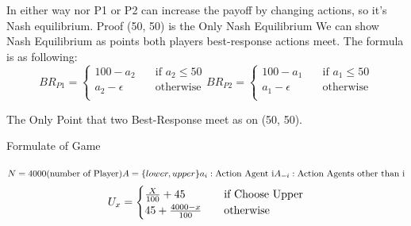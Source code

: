 \documentclass[
  course = {{IE579 Game Theory and Multi-Agent Reinforcement Learning}},
  assignment = 1,
  name = {{Mohammad Mahdi Rahimi}},
  studentnumber = {{20208244}},
  email = {{mahi@kaist.ac.kr}},
  firstexercise = 1
]{aga-homework}
\begin{document}
In either way nor P1 or P2 can increase the payoff by changing actions, so it's Nash equilibrium.
\newpage
\subexercise Proof (50, 50) is the Only Nash Equilibrium
We can show Nash Equilibrium as points both players best-response actions meet.
The formula is as following:
\[ BR_{P1} = 
     \begin{cases}
       100 - a_2 &\quad\text{if } a_2 \le 50\\
       a_2 - \epsilon &\quad\text{otherwise}\\ 
     \end{cases}
     BR_{P2} = 
     \begin{cases}
       100 - a_1 &\quad\text{if } a_1 \le 50\\
       a_1 - \epsilon &\quad\text{otherwise}\\ 
     \end{cases}
\]
\begin{center}
\end{center}
The Only Point that two Best-Response meet as on (50, 50).


\exercise
\subexercise Formulate of Game
\\\\
$
N = 4000 \text{(number of Player)}\\\\
A = \{lower, upper\}
a_i: \text{Action Agent i} \\\\
A_{-i}: \text{Action Agents other than i} \\\\
$
\[
U_{x} = 
     \begin{cases}
      {\frac{X}{100}} + 45 &\quad\text {if Choose Upper} \\
      45 + {4000 - x \over 100} &\quad\text{otherwise}\\ 
     \end{cases}
\]
\end{document}
